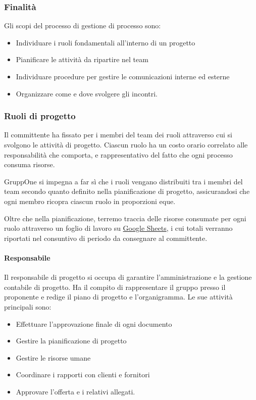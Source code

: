 \documentclass[../../norme-di-progetto.tex]{subfiles}
\begin{document}
\subsubsection{Finalità}%
\label{subs:gestione_di_processo/finalita}

Gli scopi del processo di gestione di processo sono:

\begin{itemize}
  \item Individuare i ruoli fondamentali all'interno di un progetto
  \item Pianificare le attività da ripartire nel team
  \item Individuare procedure per gestire le comunicazioni interne ed esterne
  \item Organizzare come e dove svolgere gli incontri.
\end{itemize}

\subsubsection{Ruoli di progetto}%
\label{subs:ruoli_di_progetto}

Il committente ha fissato per i membri del team dei ruoli attraverso cui si svolgono le attività di progetto. Ciascun ruolo ha un costo orario correlato alle responsabilità che comporta, e rappresentativo del fatto che ogni processo consuma risorse.

GruppOne si impegna a far sì che i ruoli vengano distribuiti tra i membri del team secondo quanto definito nella pianificazione di progetto, assicurandosi che ogni membro ricopra ciascun ruolo in proporzioni eque.

Oltre che nella pianificazione, terremo traccia delle risorse consumate per ogni ruolo attraverso un foglio di lavoro su \href{https://www.google.it/intl/it/sheets/about/}{Google Sheets}, i cui totali verranno riportati nel consuntivo di periodo da consegnare al committente.

\paragraph{Responsabile}%
\label{par:responsabile}
Il responsabile di progetto si occupa di garantire l'amministrazione e la gestione contabile di progetto.
Ha il compito di rappresentare il gruppo presso il proponente e redige il piano di progetto e l'organigramma.
Le sue attività principali sono:

\begin{itemize}
  \item Effettuare l'approvazione finale di ogni documento
  \item Gestire la pianificazione di progetto
  \item Gestire le risorse umane
  \item Coordinare i rapporti con clienti e fornitori
  \item Approvare l'offerta e i relativi allegati.
\end{itemize}
\end{document}
